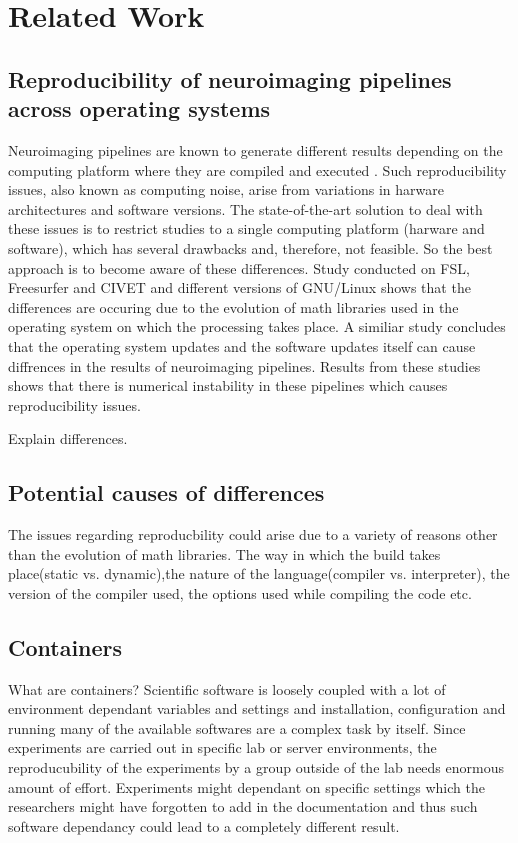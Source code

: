 \chapter{Related Work}

\section{Reproducibility of neuroimaging pipelines across operating systems}
Neuroimaging pipelines are known to generate different results depending on the computing platform where they are compiled and executed \cite{Gla15}. Such reproducibility issues, also known as computing noise, arise from variations in harware architectures and software versions. The state-of-the-art solution to deal with these issues is to restrict studies to a single computing platform (harware and software), which has several drawbacks and, therefore, not feasible. So the best approach is to become aware of these differences.
Study conducted on FSL, Freesurfer and CIVET and different versions of GNU/Linux \cite{Gla15} shows that the differences are occuring due to the evolution of math libraries used in the operating system on which the processing takes place. A similiar study \cite{10.1371/journal.pone.0038234} concludes that the operating system updates and the software updates itself can cause diffrences in the results of neuroimaging pipelines. Results from these studies shows that there is numerical instability in these pipelines which causes reproducibility issues.

Explain differences.

\section{Potential causes of differences}
The issues regarding reproducbility could arise due to a variety of reasons other than the evolution of math libraries. The way in which the build takes place(static vs. dynamic),the nature of the language(compiler vs. interpreter), the version of the compiler used, the options used while compiling the code etc. 

\section{Containers}
What are containers?
Scientific software is loosely coupled with a lot of environment dependant variables and settings and installation, configuration and running many of the available softwares are a complex task by itself. Since experiments are carried out in specific lab or server environments, the reproducubility of the experiments by a group outside of the lab needs enormous amount of effort. Experiments might dependant on specific settings which the researchers might have forgotten to add in the documentation and thus such software dependancy could lead to a completely different result. 

